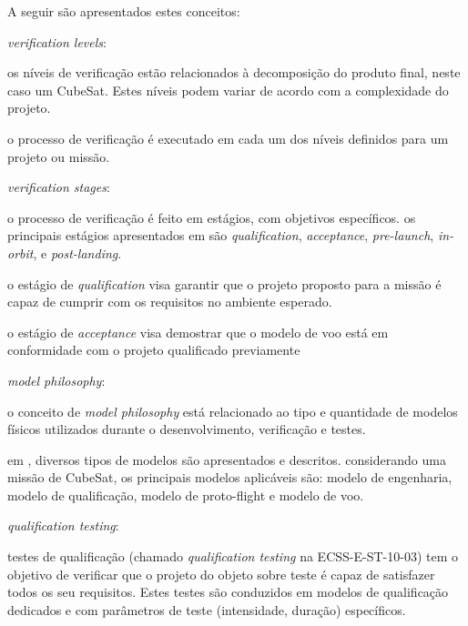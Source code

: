 A seguir são apresentados estes conceitos:

\vspace{1mm}
\begin{alineas}
    \item \textit{verification levels}:
    \begin{alineas}
        \item os níveis de verificação estão relacionados à decomposição do produto final, neste caso um CubeSat. Estes níveis podem variar de acordo com a complexidade do projeto.
        \item o processo de verificação é executado em cada um dos níveis definidos para um projeto ou missão.
    \end{alineas}

    \item \textit{verification stages}:
    \begin{alineas}
        \item o processo de verificação é feito em estágios, com objetivos específicos. os principais estágios apresentados em \textcite{ecss-e-st-10-02} são \textit{qualification}, \textit{acceptance}, \textit{pre-launch}, \textit{in-orbit}, e \textit{post-landing}.

        \item o estágio de \textit{qualification} visa garantir que o projeto proposto para a missão é capaz de cumprir com os requisitos no ambiente esperado.
        \item o estágio de \textit{acceptance} visa demostrar que o modelo de voo está em conformidade com o projeto qualificado previamente
    \end{alineas}

    \item \textit{model philosophy}:
    \begin{alineas}
        \item o conceito de \textit{model philosophy} está relacionado ao tipo e quantidade de modelos físicos utilizados durante o desenvolvimento, verificação e testes.
        \item em \textcite{ecss-e-hb-10-02}, diversos tipos de modelos são apresentados e descritos. considerando uma missão de CubeSat, os principais modelos aplicáveis são: modelo de engenharia, modelo de qualificação, modelo de proto-flight e modelo de voo.
    \end{alineas}

    \item \textit{qualification testing}:
    \begin{alineas}
        \item testes de qualificação (chamado \textit{qualification testing} na ECSS-E-ST-10-03) tem o objetivo de verificar que o projeto do objeto sobre teste é capaz de satisfazer todos os seu requisitos. Estes testes são conduzidos em modelos de qualificação dedicados e com parâmetros de teste (intensidade, duração) específicos.
    \end{alineas}


\end{alineas}
